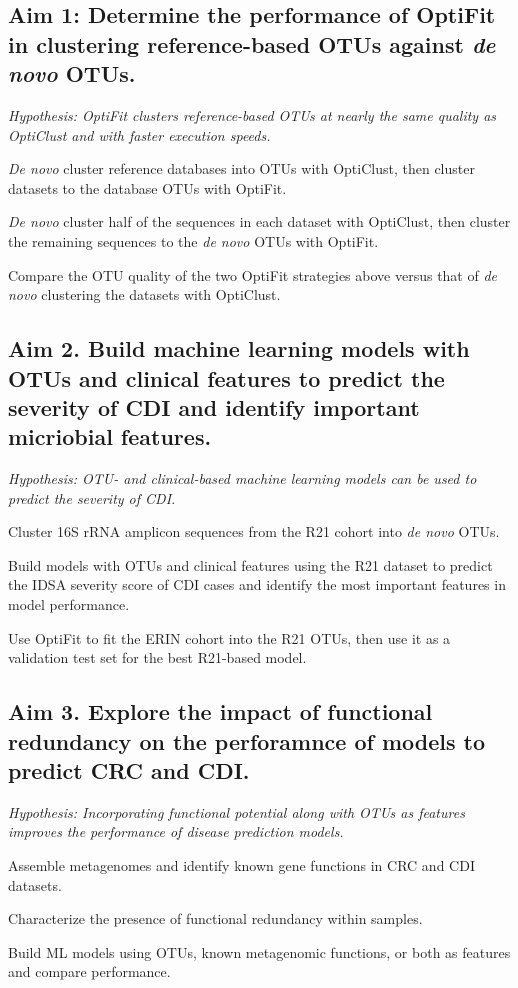 \documentclass[11pt]{article}
\begin{document}
\subsection*{Aim 1: Determine the performance of OptiFit in clustering reference-based OTUs against \textit{de novo} OTUs.}
\textit{Hypothesis: OptiFit clusters reference-based OTUs at nearly the same quality as OptiClust and with faster execution speeds.}

\begin{compactenum}[A.]
    \item \textit{De novo} cluster reference databases into OTUs with OptiClust, then cluster datasets to the database OTUs with OptiFit.
    \item \textit{De novo} cluster half of the sequences in each dataset with OptiClust, then cluster the remaining sequences to the \textit{de novo} OTUs with OptiFit.
    \item Compare the OTU quality of the two OptiFit strategies above versus that of \textit{de novo} clustering the datasets with OptiClust.
\end{compactenum}

\subsection*{Aim 2. Build machine learning models with OTUs and clinical features to predict the severity of CDI and identify important micriobial features.}
\textit{Hypothesis: OTU- and clinical-based machine learning models can be used to predict the severity of CDI.}

\begin{compactenum}[A.]
    \item Cluster 16S rRNA amplicon sequences from the R21 cohort into \textit{de novo} OTUs.
    \item Build models with OTUs and clinical features using the R21 dataset to predict the IDSA severity score of CDI cases and identify the most important features in model performance.
    \item Use OptiFit to fit the ERIN cohort into the R21 OTUs, then use it as a validation test set for the best R21-based model.
\end{compactenum}

\subsection*{Aim 3. Explore the impact of functional redundancy on the perforamnce of models to predict CRC and CDI.}
\textit{Hypothesis: Incorporating functional potential along with OTUs as features improves the performance of disease prediction models.}

\begin{compactenum}[A.]
    \item Assemble metagenomes and identify known gene functions in CRC and CDI datasets.
    \item Characterize the presence of functional redundancy within samples.
    \item Build ML models using OTUs, known metagenomic functions, or both as features and compare performance.
\end{compactenum}
\end{document}
